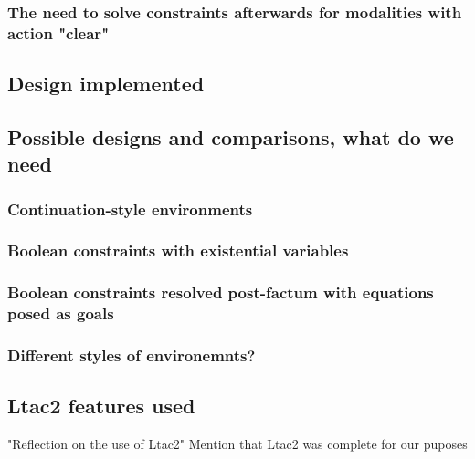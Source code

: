\subsubsection{The need to solve constraints afterwards for modalities with action "clear"}

\subsection{Design implemented}

\subsection{Possible designs and comparisons, what do we need}

\subsubsection{Continuation-style environments}

\subsubsection{Boolean constraints with existential variables}

\subsubsection{Boolean constraints resolved post-factum with equations posed as goals}

\subsubsection{Different styles of environemnts?}

\subsection{Ltac2 features used}

"Reflection on the use of Ltac2"
Mention that Ltac2 was complete for our puposes

